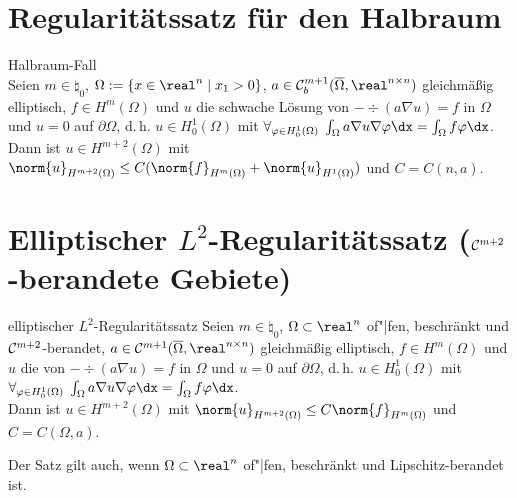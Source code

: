 \section{%
    Regularitätssatz für den Halbraum%
}

\begin{Satz}{Halbraum-Fall}\\
    Seien $m \in \natural_0$,
    $\Omega := \{x \in \real^n \;|\; x_1 > 0\}$,
    $a \in \C^{m+1}_b(\overline{\Omega}, \real^{n \times n})$ gleichmäßig elliptisch,
    $f \in H^m(\Omega)$ und $u$ die schwache Lösung von
    $-\div(a \nabla u) = f$ in $\Omega$ und $u = 0$ auf $\partial\Omega$, d.\,h.
    $u \in H^1_0(\Omega)$ mit $\forall_{\varphi \in H^1_0(\Omega)}\;
    \int_\Omega a \nabla u \nabla\varphi \dx = \int_\Omega f\varphi \dx$.\\
    Dann ist $u \in H^{m+2}(\Omega)$ mit
    $\norm{u}_{H^{m+2}(\Omega)} \le
    C (\norm{f}_{H^m(\Omega)} + \norm{u}_{H^1(\Omega)})$ und $C = C(n, a)$.
\end{Satz}

\pagebreak

\section{%
    Elliptischer \texorpdfstring{$L^2$}{L²}-Regularitätssatz
    (\texorpdfstring{$\mathcal{C}^{m+2}$}{Cᵐ⁺²}-berandete Gebiete)%
}

\begin{Satz}{elliptischer $L^2$-Regularitätssatz}
    Seien $m \in \natural_0$,
    $\Omega \subset \real^n$ of"|fen, beschränkt und $\mathcal{C}^{m+2}$-berandet,
    $a \in \C^{m+1}(\overline{\Omega}, \real^{n \times n})$ gleichmäßig elliptisch,
    $f \in H^m(\Omega)$ und $u$ die  von
    $-\div(a \nabla u) = f$ in $\Omega$ und $u = 0$ auf $\partial\Omega$, d.\,h.
    $u \in H^1_0(\Omega)$ mit $\forall_{\varphi \in H^1_0(\Omega)}\;
    \int_\Omega a \nabla u \nabla\varphi \dx = \int_\Omega f\varphi \dx$.\\
    Dann ist $u \in H^{m+2}(\Omega)$ mit
    $\norm{u}_{H^{m+2}(\Omega)} \le C \norm{f}_{H^m(\Omega)}$ und $C = C(\Omega, a)$.
\end{Satz}

\begin{Bem}
    Der Satz gilt auch, wenn $\Omega \subset \real^n$ of"|fen, beschränkt und Lipschitz-berandet
    ist.
\end{Bem}

\linie

